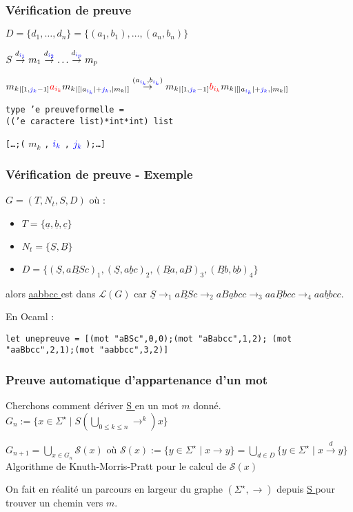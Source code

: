 \documentclass[12pt]{beamer}
\newcommand{\norm}[1]{\lvert #1 \rvert}
\begin{document}
\begin{frame}\frametitle{Vérification de preuve}
$D = \{d_1,\dots,d_n\} = \{(a_1,b_1),\dots,(a_n,b_n)\}$

$S \overset{d_{\color{blue} i_1}}{\rightarrow} m_1 \overset{d_{\color{blue} i_2}}{\rightarrow} \dots \overset{d_{\color{blue} i_p}}{\rightarrow} m_p$

${m_k}_{\mid [1,{\color{blue} j_k} - 1]} {\color{red} a_{i_k} } {m_k}_{\mid [\norm{a_{{\color{blue} i_k}}} + {\color{blue} j_k},\norm{m_k}]} \overset{(a_{{\color{blue} i_k}},b_{{\color{blue} i_k}})}{\rightarrow} {m_k}_{\mid [1,{\color{blue} j_k} - 1]} {\color{red} b_{i_k} } {m_k}_{\mid [\norm{a_{{\color{blue} i_k}}} + {\color{blue} j_k},\norm{m_k}]}$

{\small \color{DarkBlue}\texttt{type 'e preuveformelle = \\
(('e caractere list)*int*int) list}}

{\small \color{DarkBlue}\texttt{[\dots ;(}}
$m_k$
{\small \color{DarkBlue}\texttt{,}}
$\color{blue} i_k$
{\small \color{DarkBlue}\texttt{,}}
$\color{blue} j_k$
{\small \color{DarkBlue}\texttt{);\dots ]}}
\end{frame}
\begin{frame}\frametitle{Vérification de preuve - Exemple}
$G = (T,N_t,S,D)$ où :
\begin{itemize}
\item $T = \{\underline{ a },\underline{ b },\underline{ c }\}$
\item $N_t = \{\underline{ S },\underline{ B }\}$
\item $D = \{(\underline{ S },\underline{ aBSc })_1,(\underline{ S },\underline{ abc })_2,(\underline{ Ba },\underline{ aB })_3,(\underline{ Bb },\underline{ bb })_4\}$
\end{itemize}

alors \underline{ aabbcc } est dans $\mathcal{L}(G)$ car $\underline{ S } \rightarrow_1 \underline{ aBSc } \rightarrow_2 \underline{ aBabcc } \rightarrow_3 \underline{ aaBbcc } \rightarrow_4 \underline{ aabbcc }$.

En Ocaml :

{\small \color{DarkBlue}\texttt{let unepreuve = [(mot "aBSc",0,0);(mot "aBabcc",1,2);
		 (mot "aaBbcc",2,1);(mot "aabbcc",3,2)]}}
\end{frame}

\begin{frame}\frametitle{Preuve automatique d'appartenance d'un mot}
Cherchons comment dériver \underline{ S } en un mot $m$ donné.
$G_n := \{x \in \Sigma^\star \mid S (\bigcup_{0 \leq k \leq n} \rightarrow^k) x\}$

$G_{n+1} = \bigcup_{x \in G_n} \mathcal{S}(x)$
où 
$\mathcal{S}(x) := \{y \in \Sigma^\star \mid x \rightarrow y \} = \bigcup_{d \in D} \{y \in \Sigma^\star \mid x \overset{d}{\rightarrow} y \}$
Algorithme de Knuth-Morris-Pratt pour le calcul de $\mathcal{S}(x)$

On fait en réalité un parcours en largeur du graphe $(\Sigma^\star,\rightarrow)$ depuis \underline{ S } pour trouver un chemin vers $m$.
\end{frame}
\end{document}
